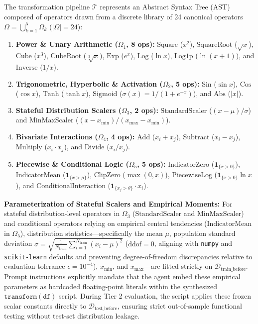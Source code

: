 \documentclass[sigconf]{acmart}
\begin{document}
The transformation pipeline $\mathcal{T}$ represents an Abstract Syntax Tree (AST) composed of operators drawn from a discrete library of 24 canonical operators $\Omega = \bigcup_{k=1}^5 \Omega_k$ ($|\Omega| = 24$):
\begin{enumerate}
    \item \textbf{Power \& Unary Arithmetic ($\Omega_1$, 8 ops):} $\text{Square}$ ($x^2$), $\text{SquareRoot}$ ($\sqrt{x}$), $\text{Cube}$ ($x^3$), $\text{CubeRoot}$ ($\sqrt[3]{x}$), $\text{Exp}$ ($e^x$), $\text{Log}$ ($\ln x$), $\text{Log1p}$ ($\ln(x+1)$), and $\text{Inverse}$ ($1/x$).
    \item \textbf{Trigonometric, Hyperbolic \& Activation ($\Omega_2$, 5 ops):} $\text{Sin}$ ($\sin x$), $\text{Cos}$ ($\cos x$), $\text{Tanh}$ ($\tanh x$), $\text{Sigmoid}$ ($\sigma(x) = 1/(1+e^{-x})$), and $\text{Abs}$ ($|x|$).
    \item \textbf{Stateful Distribution Scalers ($\Omega_3$, 2 ops):} $\text{StandardScaler}$ ($(x-\mu)/\sigma$) and $\text{MinMaxScaler}$ ($(x-x_{\min})/(x_{\max}-x_{\min})$).
    \item \textbf{Bivariate Interactions ($\Omega_4$, 4 ops):} $\text{Add}$ ($x_i + x_j$), $\text{Subtract}$ ($x_i - x_j$), $\text{Multiply}$ ($x_i \cdot x_j$), and $\text{Divide}$ ($x_i / x_j$).
    \item \textbf{Piecewise \& Conditional Logic ($\Omega_5$, 5 ops):} $\text{IndicatorZero}$ ($\mathbf{1}_{\{x > 0\}}$), $\text{IndicatorMean}$ ($\mathbf{1}_{\{x > \mu\}}$), $\text{ClipZero}$ ($\max(0, x)$), $\text{PiecewiseLog}$ ($\mathbf{1}_{\{x > 0\}} \ln x$), and $\text{ConditionalInteraction}$ ($\mathbf{1}_{\{x_j > \theta\}} \cdot x_i$).
\end{enumerate}

\noindent\textbf{Parameterization of Stateful Scalers and Empirical Moments:} For stateful distribution-level operators in $\Omega_3$ ($\text{StandardScaler}$ and $\text{MinMaxScaler}$) and conditional operators relying on empirical central tendencies ($\text{IndicatorMean}$ in $\Omega_5$), distribution statistics—specifically the mean $\mu$, population standard deviation $\sigma = \sqrt{\frac{1}{N_{\text{train}}} \sum_{i=1}^{N_{\text{train}}} (x_i - \mu)^2}$ ($\text{ddof}=0$, aligning with \texttt{numpy} and \texttt{scikit-learn} defaults and preventing degree-of-freedom discrepancies relative to evaluation tolerance $\epsilon=10^{-4}$), $x_{\min}$, and $x_{\max}$—are fitted strictly on $\mathcal{D}_{\text{train\_before}}$. Prompt instructions explicitly mandate that the agent embed these empirical parameters as hardcoded floating-point literals within the synthesized $\texttt{transform}(\texttt{df})$ script. During Tier 2 evaluation, the script applies these frozen scalar constants directly to $\mathcal{D}_{\text{test\_before}}$, ensuring strict out-of-sample functional testing without test-set distribution leakage.
\end{document}
